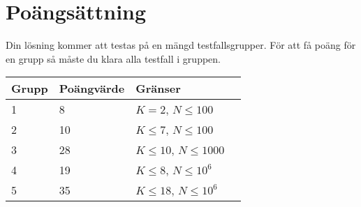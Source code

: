 \section*{Poängsättning}
Din lösning kommer att testas på en mängd testfallsgrupper. För att få poäng för en grupp
så måste du klara alla testfall i gruppen.
\begin{tabular}{| l | l | l | l |}
\hline
Grupp & Poängvärde & Gränser \\ \hline
	1     & 8 & $K = 2$, $N \le 100$ \\ \hline
	2     & 10 & $K \le 7$, $N \le 100$ \\ \hline
	3     & 28 & $K \le 10$, $N \le 1000$ \\ \hline
	4     & 19 & $K \le 8$, $N \le 10^6$ \\ \hline
	5     & 35 & $K \le 18$, $N \le 10^6$ \\ \hline
\end{tabular}
